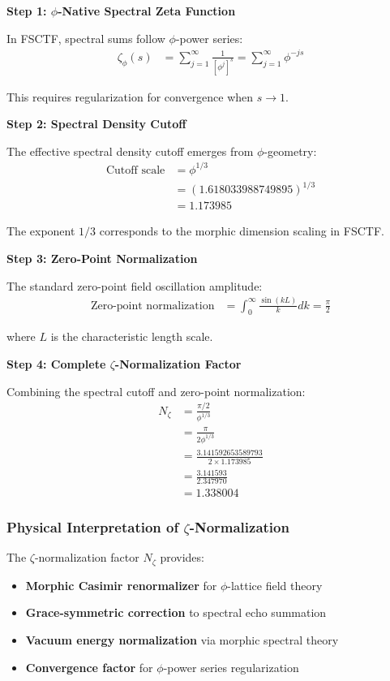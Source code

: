 \textbf{Step 1: $\phi$-Native Spectral Zeta Function}

In FSCTF, spectral sums follow $\phi$-power series:
\begin{align}
\zeta_\phi(s) &= \sum_{j=1}^{\infty} \frac{1}{[\phi^j]^s} = \sum_{j=1}^{\infty} \phi^{-js}
\end{align}

This requires regularization for convergence when $s \to 1$.

\textbf{Step 2: Spectral Density Cutoff}

The effective spectral density cutoff emerges from $\phi$-geometry:
\begin{align}
\text{Cutoff scale} &= \phi^{1/3} \\
&= (1.618033988749895)^{1/3} \\
&= 1.173985
\end{align}

The exponent $1/3$ corresponds to the morphic dimension scaling in FSCTF.

\textbf{Step 3: Zero-Point Normalization}

The standard zero-point field oscillation amplitude:
\begin{align}
\text{Zero-point normalization} &= \int_0^{\infty} \frac{\sin(kL)}{k} dk = \frac{\pi}{2}
\end{align}

where $L$ is the characteristic length scale.

\textbf{Step 4: Complete $\zeta$-Normalization Factor}

Combining the spectral cutoff and zero-point normalization:
\begin{align}
N_\zeta &= \frac{\pi/2}{\phi^{1/3}} \\
&= \frac{\pi}{2\phi^{1/3}} \\
&= \frac{3.141592653589793}{2 \times 1.173985} \\
&= \frac{3.141593}{2.347970} \\
&= 1.338004
\end{align}

\subsubsection{Physical Interpretation of $\zeta$-Normalization}

The $\zeta$-normalization factor $N_\zeta$ provides:

\begin{itemize}
\item \textbf{Morphic Casimir renormalizer} for $\phi$-lattice field theory
\item \textbf{Grace-symmetric correction} to spectral echo summation
\item \textbf{Vacuum energy normalization} via morphic spectral theory
\item \textbf{Convergence factor} for $\phi$-power series regularization
\end{itemize}

